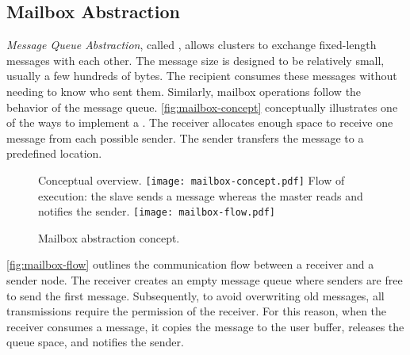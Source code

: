 		\subsection{Mailbox Abstraction}
		\label{sec.mailbox-abs}



			\textit{Message Queue Abstraction}, called \mailbox, allows clusters to exchange
			fixed-length messages with each other. The message size is designed to be
			relatively small, usually a few hundreds of bytes. The recipient consumes these
			messages without needing to know who sent them. Similarly, mailbox operations
			follow the behavior of the \posix message queue. \autoref{fig:mailbox-concept}
			conceptually illustrates one of the ways to implement a \mailbox. The receiver
			allocates enough space to receive one message from each possible sender.
			The sender transfers the message to a predefined location.

			\begin{figure}[!tb]
				\centering%
				\caption{Mailbox abstraction concept.}%
				\label{fig:mailbox}%

					{Conceptual overview.}%
					{\texttt{[image: mailbox-concept.pdf]}}%
				\hspace{1cm}%
					{Flow of execution: the slave sends a message whereas the master reads and notifies the sender.}%
					{\texttt{[image: mailbox-flow.pdf]}}%

			\end{figure}

			\autoref{fig:mailbox-flow} outlines the communication flow between a
			receiver and a sender node. The receiver creates an empty message queue
			where senders are free to send the first message. Subsequently, to
			avoid overwriting old messages, all transmissions require the permission
			of the receiver. For this reason,  when the receiver consumes a message,
			it copies the message to the user buffer, releases the queue space, and
			notifies the sender.
			
